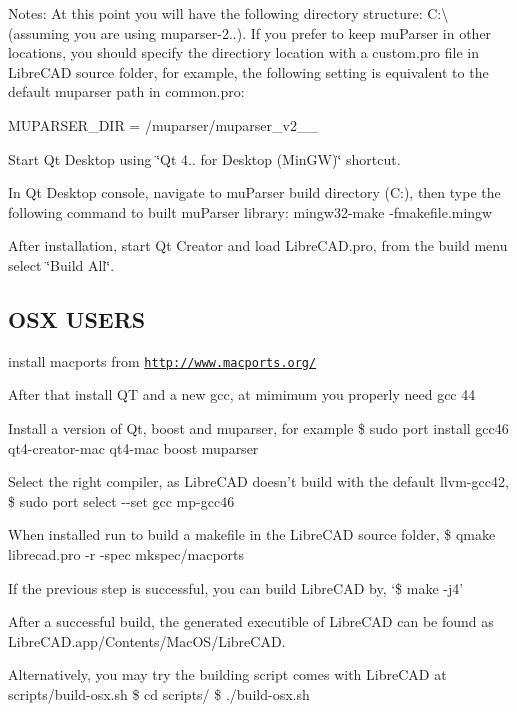 Notes\-: At this point you will have the following directory structure\-: C\-:\textbackslash{} (assuming you are using muparser-\/2..). If you prefer to keep mu\-Parser in other locations, you should specify the directiory location with a custom.\-pro file in Libre\-C\-A\-D source folder, for example, the following setting is equivalent to the default muparser path in common.\-pro\-:

{\ttfamily M\-U\-P\-A\-R\-S\-E\-R\-\_\-\-D\-I\-R = /muparser/muparser\-\_\-v2\-\_\-\_}


\begin{DoxyItemize}
\item Start Qt Desktop using \char`\"{}\-Qt 4.. for Desktop (\-Min\-G\-W)\char`\"{} shortcut.
\item In Qt Desktop console, navigate to mu\-Parser build directory (C\-:), then type the following command to built mu\-Parser library\-: {\ttfamily mingw32-\/make -\/fmakefile.\-mingw}
\end{DoxyItemize}

After installation, start Qt Creator and load Libre\-C\-A\-D.\-pro, from the build menu select \char`\"{}\-Build All\char`\"{}.

\subsection*{O\-S\-X U\-S\-E\-R\-S}

install macports from \href{http://www.macports.org/}{\tt http\-://www.\-macports.\-org/}

After that install Q\-T and a new gcc, at mimimum you properly need gcc 44

Install a version of Qt, boost and muparser, for example {\ttfamily \$ sudo port install gcc46 qt4-\/creator-\/mac qt4-\/mac boost muparser}

Select the right compiler, as Libre\-C\-A\-D doesn't build with the default llvm-\/gcc42, {\ttfamily \$ sudo port select -\/-\/set gcc mp-\/gcc46}

When installed run to build a makefile in the Libre\-C\-A\-D source folder, {\ttfamily \$ qmake librecad.\-pro -\/r -\/spec mkspec/macports}

If the previous step is successful, you can build Libre\-C\-A\-D by, `\$ make -\/j4'

After a successful build, the generated executible of Libre\-C\-A\-D can be found as Libre\-C\-A\-D.\-app/\-Contents/\-Mac\-O\-S/\-Libre\-C\-A\-D.

Alternatively, you may try the building script comes with Libre\-C\-A\-D at scripts/build-\/osx.\-sh {\ttfamily \$ cd scripts/} {\ttfamily \$ ./build-\/osx.sh} 